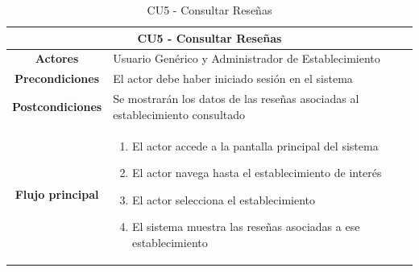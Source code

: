 \begin{table}[h]
    \centering
    \begin{tabular}{|c|p{10cm}|}
        \hline
        \multicolumn{2}{|c|}{\textbf{CU5 - Consultar Reseñas}}                                                   \\
        \hline
        \textbf{Actores}         & Usuario Genérico y Administrador de Establecimiento                           \\
        \hline
        \textbf{Precondiciones}  & El actor debe haber iniciado sesión en el sistema                             \\
        \hline
        \textbf{Postcondiciones} & Se mostrarán los datos de las reseñas asociadas al establecimiento consultado \\
        \hline
        \textbf{Flujo principal} & \begin{enumerate}
                                       \item El actor accede a la pantalla principal del sistema
                                       \item El actor navega hasta el establecimiento de interés
                                       \item El actor selecciona el establecimiento
                                       \item El sistema muestra las reseñas asociadas a ese establecimiento
                                   \end{enumerate}           \\
        \hline
    \end{tabular}
    \caption{CU5 - Consultar Reseñas }
\end{table}

